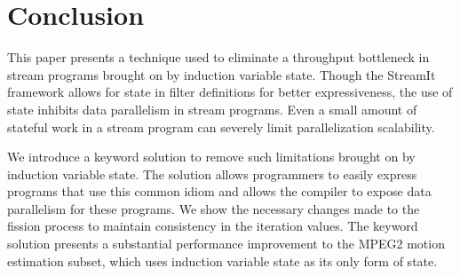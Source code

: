 \section{Conclusion}
\label{sec:conclusion}

This paper presents a technique used to eliminate a throughput bottleneck in stream programs brought on by induction variable state.  Though the StreamIt framework allows for state in filter definitions for better expressiveness, the use of state inhibits data parallelism in stream programs.  Even a small amount of stateful work in a stream program can severely limit parallelization scalability.  

We introduce a keyword solution to remove such limitations brought on by induction variable state.  The solution allows programmers to easily express programs that use this common idiom and allows the compiler to expose data parallelism for these programs.  We show the necessary changes made to the fission process to maintain consistency in the iteration values.  The keyword solution presents a substantial performance improvement to the MPEG2 motion estimation subset, which uses induction variable state as its only form of state.  


%

